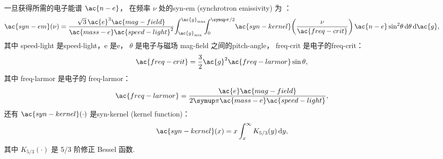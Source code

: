 一旦获得所需的电子能谱 $\ac{n-e}$，
在频率 $\nu$ 处的\acl{syn-em} (synchrotron emissivity) 为 \cite{rybicki1979}：
\begin{equation}
  \label{sec:jnu-sync}
  \ac{syn-em}(\nu) =
    \frac{\sqrt{3} \,\ac{e}^3 \ac{mag-field}}{\ac{mass-e}\ac{speed-light}^2}
    \!\int_{\ac{g}_{\R{min}}}^{\ac{g}_{\R{max}}}
    \!\!\!\int_0^{\Cpi/2}
    \! \ac{syn-kernel}\!\left( \frac{\nu}{\ac{freq-crit}} \right)
    \ac{n-e} \sin^2 \!\theta \,\D{\theta} \,\D{\ac{g}} ,
\end{equation}
其中
\ac{speed-light} 是\acl{speed-light}，\ac{e} 是\acl{e}，
$\theta$ 是电子与磁场 \ac{mag-field} 之间的\ac{pitch-angle}，
\ac{freq-crit} 是电子的\acl{freq-crit}：
\begin{equation}
  \ac{freq-crit} = \frac{3}{2} \ac{g}^2 \ac{freq-larmor} \sin\theta ,
\end{equation}
其中 \ac{freq-larmor} 是电子的 \acl{freq-larmor}：
\begin{equation}
  \ac{freq-larmor} =
    \frac{\ac{e}\ac{mag-field}}{2\Cpi \ac{mass-e}\ac{speed-light}} ,
\end{equation}
还有 $\ac{syn-kernel}(\cdot)$ 是\acl{syn-kernel} (kernel function)：
\begin{equation}
  \ac{syn-kernel}(x) = x \int_x^{\infty} K_{5/3}(y) \,\D{y} ,
\end{equation}
其中 $K_{5/3}(\cdot)$ 是 5/3 阶修正 Bessel 函数.

